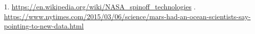 \documentclass[main.tex]{subfiles}
\begin{document}
1. \url{https://en.wikipedia.org/wiki/NASA_spinoff_technologies}
. \url{https://www.nytimes.com/2015/03/06/science/mars-had-an-ocean-scientists-say-pointing-to-new-data.html}
\end{document}
